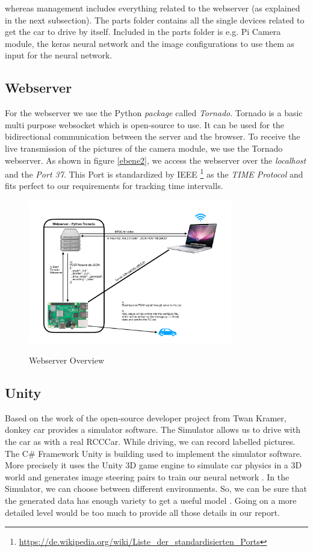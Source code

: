 \documentclass[journal]{IEEEtran}
\begin{document}
whereas management includes everything related to the webserver (as explained in the next subsection). The parts folder contains all the single devices related to get the car to drive by itself. Included in the parts folder is e.g. Pi Camera module, the keras neural network and the image configurations to use them as input for the neural network. 

\subsection{Webserver}

For the webserver we use the Python \textit{package} called \textit{Tornado}. Tornado is a basic multi purpose websocket which is open-source to use. It can be used for the bidirectional communication between the server and the browser. To receive the live transmission of the pictures of the camera module, we use the Tornado webserver. As shown in figure \ref{ebene2}, we access the webserver over the \textit{localhost} and the \textit{Port 37}. This Port is standardized by IEEE \footnote{\url{https://de.wikipedia.org/wiki/Liste_der_standardisierten_Ports}} as the \textit{TIME Protocol} and fits perfect to our requirements for tracking time intervalls.

\begin{figure}
  \begin{center}
  \includegraphics[width=3.5in]{photo/webserver.pdf}\\
  \caption{Webserver Overview}\label{webserver}
  \end{center}
\end{figure}

\subsection{Unity}

Based on the work of the open-source developer project from Twan Kramer, donkey car provides a simulator software. The Simulator allows us to drive with the car as with a real RCC\-Car. While driving, we can record labelled pictures. The C\# Framework Unity is building used to implement the simulator software. More precisely it uses the Unity 3D game engine to simulate car physics in a 3D world and generates image steering pairs to train our neural network \cite{sdsandbox}. In the Simulator, we can choose between different environments. So, we can be sure that the generated data has enough variety to get a useful model \cite{contributionOfVariables}. Going on a more detailed level would be too much to provide all those details in our report. 
\end{document}
